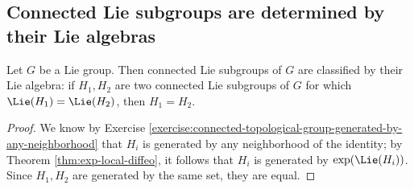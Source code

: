 \documentclass[reqno]{amsart} 
\begin{document}
\subsection{Connected Lie subgroups are determined by their Lie algebras}
\label{sec:org51d5203}
\begin{theorem}
  Let $G$ be a Lie group.
  Then connected Lie subgroups of $G$ are classified by their
  Lie algebra: if $H_1, H_2$ are two connected Lie subgroups of
  $G$ for which $\Lie(H_1) = \Lie(H_2)$, then $H_1 = H_2$.
\end{theorem}
\begin{proof}
  We know by Exercise
  \ref{exercise:connected-topological-group-generated-by-any-neighborhood}
  that $H_i$ is generated
  by any neighborhood of the identity;
  by Theorem \ref{thm:exp-local-diffeo},
  it follows that $H_i$
  is generated by $\exp(\Lie(H_i))$.
  Since $H_1,H_2$ are generated by the same set,
  they are equal.
\end{proof}
\end{document}

